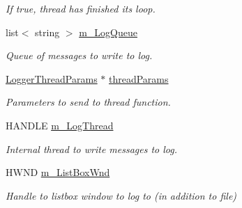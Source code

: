 \begin{DoxyCompactItemize}
\begin{DoxyCompactList}\small\item\em If true, thread has finished its loop. \end{DoxyCompactList}\item 
\hypertarget{class_logger_a55ff168a2ad3a40fdfd48b70ea63c416}{
list$<$ string $>$ \hyperlink{class_logger_a55ff168a2ad3a40fdfd48b70ea63c416}{m\_\-LogQueue}}
\label{class_logger_a55ff168a2ad3a40fdfd48b70ea63c416}

\begin{DoxyCompactList}\small\item\em Queue of messages to write to log. \end{DoxyCompactList}\item 
\hypertarget{class_logger_ae481610560de4be304b49fd6798065f7}{
\hyperlink{struct_logger_thread_params}{LoggerThreadParams} $\ast$ \hyperlink{class_logger_ae481610560de4be304b49fd6798065f7}{threadParams}}
\label{class_logger_ae481610560de4be304b49fd6798065f7}

\begin{DoxyCompactList}\small\item\em Parameters to send to thread function. \end{DoxyCompactList}\item 
\hypertarget{class_logger_ad664da49d002ee7ff0b8efa7ad92729d}{
HANDLE \hyperlink{class_logger_ad664da49d002ee7ff0b8efa7ad92729d}{m\_\-LogThread}}
\label{class_logger_ad664da49d002ee7ff0b8efa7ad92729d}

\begin{DoxyCompactList}\small\item\em Internal thread to write messages to log. \end{DoxyCompactList}\item 
\hypertarget{class_logger_a508b72da07e8320747d1cdd9103d242e}{
HWND \hyperlink{class_logger_a508b72da07e8320747d1cdd9103d242e}{m\_\-ListBoxWnd}}
\label{class_logger_a508b72da07e8320747d1cdd9103d242e}

\begin{DoxyCompactList}\small\item\em Handle to listbox window to log to (in addition to file) \end{DoxyCompactList}\end{DoxyCompactItemize}
